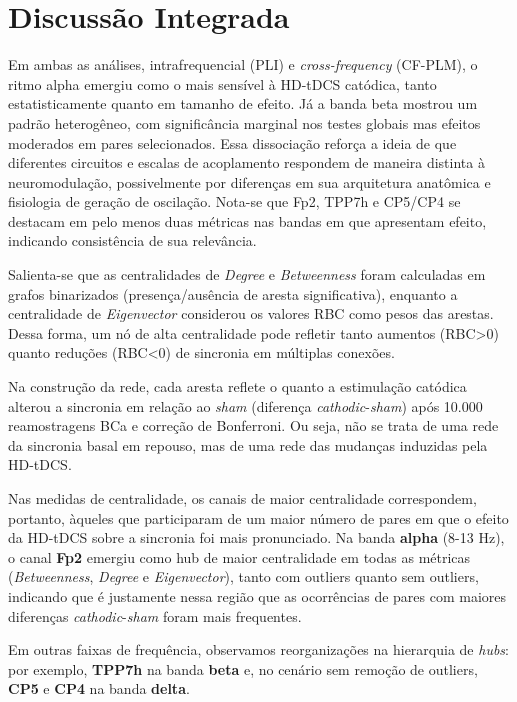 \section{Discussão Integrada}
Em ambas as análises, intrafrequencial (PLI) e \textit{cross-frequency} (CF-PLM), o ritmo alpha emergiu como o mais sensível à HD-tDCS catódica, tanto estatisticamente quanto em tamanho de efeito. Já a banda beta mostrou um padrão heterogêneo, com significância marginal nos testes globais mas efeitos moderados em pares selecionados. Essa dissociação reforça a ideia de que diferentes circuitos e escalas de acoplamento respondem de maneira distinta à neuromodulação, possivelmente por diferenças em sua arquitetura anatômica e fisiologia de geração de oscilação. Nota-se que Fp2, TPP7h e CP5/CP4 se destacam em pelo menos duas métricas nas bandas em que apresentam efeito, indicando consistência de sua relevância.

Salienta-se que as centralidades de \textit{Degree} e \textit{Betweenness} foram calculadas em grafos binarizados (presença/ausência de aresta significativa), enquanto a centralidade de \textit{Eigenvector} considerou os valores RBC como pesos das arestas. Dessa forma, um nó de alta centralidade pode refletir tanto aumentos (RBC>0) quanto reduções (RBC<0) de sincronia em múltiplas conexões.

Na construção da rede, cada aresta reflete o quanto a estimulação catódica alterou a sincronia em relação ao \textit{sham} (diferença \textit{cathodic}-\textit{sham}) após 10.000 reamostragens BCa e correção de Bonferroni. Ou seja, não se trata de uma rede da sincronia basal em repouso, mas de uma rede das mudanças induzidas pela HD-tDCS.

Nas medidas de centralidade, os canais de maior centralidade correspondem, portanto, àqueles que participaram de um maior número de pares em que o efeito da HD-tDCS sobre a sincronia foi mais pronunciado. Na banda \textbf{alpha} (8-13 Hz), o canal \textbf{Fp2} emergiu como hub de maior centralidade em todas as métricas (\textit{Betweenness}, \textit{Degree} e \textit{Eigenvector}), tanto com outliers quanto sem outliers, indicando que é justamente nessa região que as ocorrências de pares com maiores diferenças \textit{cathodic}-\textit{sham} foram mais frequentes.

Em outras faixas de frequência, observamos reorganizações na hierarquia de \textit{hubs}: por exemplo, \textbf{TPP7h} na banda \textbf{beta} e, no cenário sem remoção de outliers, \textbf{CP5} e \textbf{CP4} na banda \textbf{delta}.

